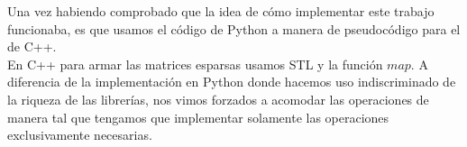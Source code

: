 Una vez habiendo comprobado que la idea de cómo implementar este trabajo funcionaba, es que usamos el código de Python a manera de pseudocódigo para el de C++.\\

En C++ para armar las matrices esparsas usamos STL y la función $map$. A diferencia de la implementación en Python donde hacemos uso indiscriminado de la riqueza de las librerías, nos vimos forzados a acomodar las operaciones de manera tal que tengamos que implementar solamente las operaciones exclusivamente necesarias.




